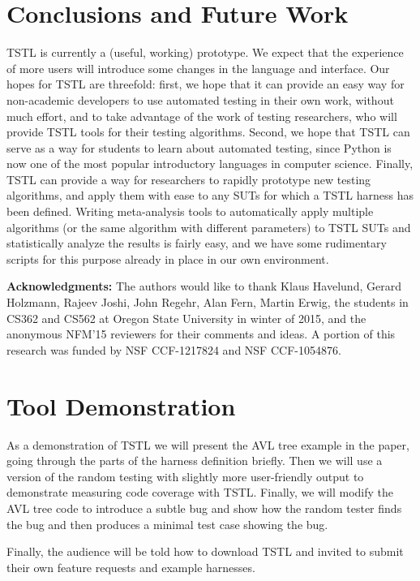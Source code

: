 \documentclass{sig-alternate}
\begin{document}
\section{Conclusions and Future Work}

TSTL is currently a (useful, working) prototype.  We expect that the
experience of more users will introduce some changes in the language
and interface.  Our hopes for TSTL are threefold:  first, we hope that
it can provide an easy way for non-academic developers to use
automated testing in their own work, without much effort, and to take
advantage of the work of testing researchers, who will provide TSTL
tools for their testing algorithms.  Second, we hope that TSTL can
serve as a way for students to learn about automated testing, since
Python is now one of the most popular introductory languages in
computer science.  Finally, TSTL can provide a way for researchers to
rapidly prototype new testing algorithms, and apply them with ease to
any SUTs for which a TSTL harness has been defined.  Writing
meta-analysis tools to automatically apply multiple algorithms (or the
same algorithm with different parameters) to TSTL SUTs and
statistically analyze the results is fairly easy, and we have some
rudimentary scripts for this purpose already in place in our own environment.

{\bf Acknowledgments:} The authors would like to thank Klaus Havelund,
Gerard Holzmann, Rajeev Joshi, John Regehr, Alan Fern, Martin Erwig,
the students in CS362 and CS562 at Oregon State University in winter
of 2015, and the anonymous NFM'15 reviewers for their comments and
ideas.  A portion of this research was funded by NSF CCF-1217824 and
NSF CCF-1054876.




\newpage

\appendix

\section{Tool Demonstration}

As a demonstration of TSTL we will present the AVL tree example in the
paper, going through the parts of the harness definition briefly.
Then we will use a version of the random testing with slightly more
user-friendly output to demonstrate measuring code coverage with
TSTL.  Finally, we will modify the AVL tree code to introduce a subtle
bug and show how the random tester finds the bug and then produces a
minimal test case showing the bug.

Finally, the audience will be told how to download TSTL and invited to
submit their own feature requests and example harnesses.
\end{document}
